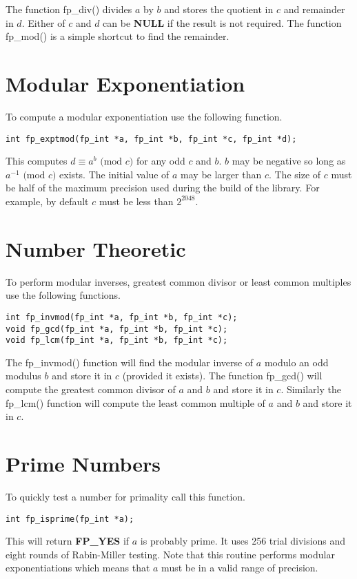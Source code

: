 \documentclass[b5paper]{book}
\begin{document}
The function fp\_div() divides $a$ by $b$ and stores the quotient in $c$ and remainder in $d$.  Either 
of $c$ and $d$ can be \textbf{NULL} if the result is not required.  The function fp\_mod() is a simple 
shortcut to find the remainder.

\section{Modular Exponentiation}
To compute a modular exponentiation use the following function.

\begin{verbatim}
int fp_exptmod(fp_int *a, fp_int *b, fp_int *c, fp_int *d);
\end{verbatim}
This computes $d \equiv a^b \mbox{ (mod }c\mbox{)}$ for any odd $c$ and $b$.  $b$ may be negative so long as 
$a^{-1} \mbox{ (mod }c\mbox{)}$ exists.  The initial value of $a$ may be larger than $c$.  The size of $c$ must be 
half of the maximum precision used during the build of the library.  For example, by default $c$ must be less 
than $2^{2048}$.  

\section{Number Theoretic}

To perform modular inverses, greatest common divisor or least common multiples use the following
functions.

  
\begin{verbatim}
int fp_invmod(fp_int *a, fp_int *b, fp_int *c);
void fp_gcd(fp_int *a, fp_int *b, fp_int *c);
void fp_lcm(fp_int *a, fp_int *b, fp_int *c);
\end{verbatim}

The fp\_invmod() function will find the modular inverse of $a$ modulo an odd modulus $b$ and store
it in $c$ (provided it exists).  The function fp\_gcd() will compute the greatest common
divisor of $a$ and $b$ and store it in $c$.  Similarly the fp\_lcm() function will compute
the least common multiple of $a$ and $b$ and store it in $c$.

\section{Prime Numbers}
To quickly test a number for primality call this function.

\begin{verbatim}
int fp_isprime(fp_int *a);
\end{verbatim}
This will return \textbf{FP\_YES} if $a$ is probably prime.  It uses 256 trial divisions and
eight rounds of Rabin-Miller testing.  Note that this routine performs modular exponentiations
which means that $a$ must be in a valid range of precision.
\end{document}
